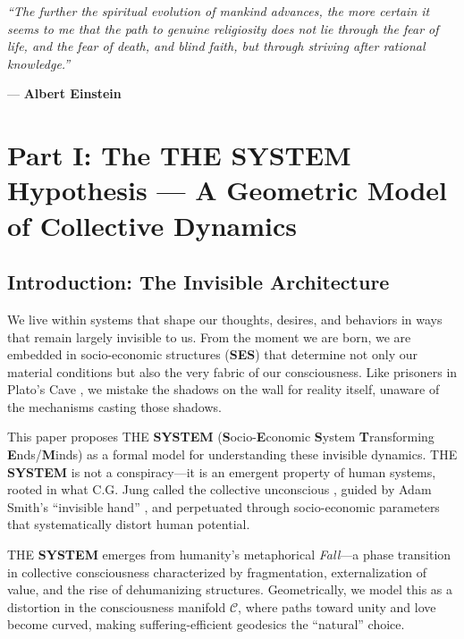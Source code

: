 \documentclass[11pt,a4paper]{article}
\newcommand{\SYSTEM}{\textbf{SYSTEM}}
\newcommand{\SES}{\textbf{SES}}
\newcommand{\CC}{$\mathcal{C}$}
\newcommand{\Fall}{\textit{Fall}}
\theoremstyle{definition}
\theoremstyle{remark}
\begin{document}
\begin{mdframed}[backgroundcolor=gray!10]
\textit{``The further the spiritual evolution of mankind advances, the more certain it seems to me that the path to genuine religiosity does not lie through the fear of life, and the fear of death, and blind faith, but through striving after rational knowledge.''}

--- \textbf{Albert Einstein} \cite{einsteinquote}
\end{mdframed}

\newpage

\section{Part I: The THE \SYSTEM{} Hypothesis --- A Geometric Model of Collective Dynamics}

\subsection{Introduction: The Invisible Architecture}

We live within systems that shape our thoughts, desires, and behaviors in ways that remain largely invisible to us. From the moment we are born, we are embedded in socio-economic structures (\SES{}) that determine not only our material conditions but also the very fabric of our consciousness. Like prisoners in Plato's Cave \cite{plato_republic}, we mistake the shadows on the wall for reality itself, unaware of the mechanisms casting those shadows.

This paper proposes THE \SYSTEM{} (\textbf{S}ocio-\textbf{E}conomic \textbf{S}ystem \textbf{T}ransforming \textbf{E}nds/\textbf{M}inds) as a formal model for understanding these invisible dynamics. THE \SYSTEM{} is not a conspiracy---it is an emergent property of human systems, rooted in what C.G. Jung called the collective unconscious \cite{jung1969collective}, guided by Adam Smith's ``invisible hand'' \cite{smith1776wealth}, and perpetuated through socio-economic parameters that systematically distort human potential.

THE \SYSTEM{} emerges from humanity's metaphorical \Fall{}---a phase transition in collective consciousness characterized by fragmentation, externalization of value, and the rise of dehumanizing structures. Geometrically, we model this as a distortion in the consciousness manifold \CC{}, where paths toward unity and love become curved, making suffering-efficient geodesics the ``natural'' choice.
\end{document}
